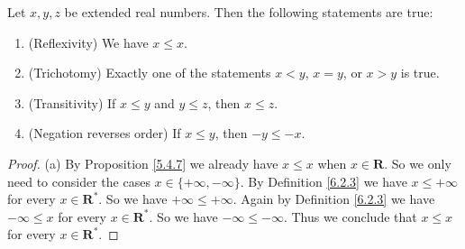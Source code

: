 \setcounter{theorem}{4}
\begin{proposition}\label{6.2.5}
      Let \(x, y, z\) be extended real numbers.
      Then the following statements are true:
      \begin{enumerate}
            \item (Reflexivity)
                  We have \(x \leq x\).
            \item (Trichotomy)
                  Exactly one of the statements \(x < y\), \(x = y\), or \(x > y\) is true.
            \item (Transitivity)
                  If \(x \leq y\) and \(y \leq z\), then \(x \leq z\).
            \item (Negation reverses order) If \(x \leq y\), then \(-y \leq -x\).
      \end{enumerate}
\end{proposition}

\begin{proof}{(a)}
      By Proposition \ref{5.4.7} we already have \(x \leq x\) when \(x \in \mathbf{R}\).
      So we only need to consider the cases \(x \in \{+\infty, -\infty\}\).
      By Definition \ref{6.2.3} we have \(x \leq +\infty\) for every \(x \in \mathbf{R}^*\).
      So we have \(+\infty \leq +\infty\).
      Again by Definition \ref{6.2.3} we have \(-\infty \leq x\) for every \(x \in \mathbf{R}^*\).
      So we have \(-\infty \leq -\infty\).
      Thus we conclude that \(x \leq x\) for every \(x \in \mathbf{R}^*\).
\end{proof}

